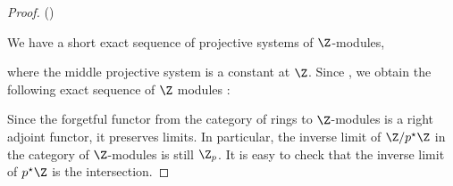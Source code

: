 \begin{proof}()
  
  We have a short exact sequence of projective systems of $\Z$-modules, 
  \begin{figure}[H]
    \centering
  \end{figure}
  where the middle projective system is a constant at $\Z$. 
  Since , we obtain the following 
  exact sequence of $\Z$ modules : 
  \begin{figure}[H]
    \centering
  \end{figure} 
  Since the forgetful functor from the category of rings to 
  $\Z$-modules is a right adjoint functor, it preserves limits.
  In particular, 
  the inverse limit of $\Z/p^\star\Z$ in the category of $\Z$-modules is 
  still $\Z_p$.
  It is easy to check that the inverse limit of $p^\star\Z$ is the intersection.
\end{proof}

